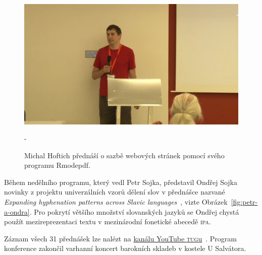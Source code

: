 \documentclass{csbulletin}
\newcommand\acro[1]{\textsc{\MakeLowercase{#1}}}
\begin{document}
\begin{figure}[p]
\centering
\includegraphics[width=\linewidth]{figs/michal-po-prednasce}\par\medskip
\fboxsep=0pt\kern-\fboxrule\relax{}%
\caption{Michal Hoftich přednáší o sazbě webových stránek pomocí svého programu Rmodepdf.}
\label{fig:michal}
\end{figure}

Během nedělního programu, který vedl Petr Sojka, představil Ondřej Sojka novinky z projektu univerzálních vzorů dělení slov v přednášce nazvané \emph{\foreignlanguage{english}{Expanding hyphenation patterns across Slavic languages}}~\cite{sojka2024extendinga, sojka2024extendingc}, vizte Obrázek~\ref{fig:petr-a-ondra}. Pro pokrytí většího množství slovanských jazyků se Ondřej chystá použít mezireprezentaci textu v mezinárodní fonetické abecedě \acro{IPA}.
\medskip

Záznam všech 31 přednášek lze nalézt na \href{https://www.youtube.com/playlist?list=PLLt9mKFAx-FZCy6aqYbXSNyaAkr8Nv14X}{kanálu YouTube \acro{TUG}u}~\cite{youtube}.
Program konference zakončil varhanní koncert barokních skladeb v kostele U Salvátora. 
\end{document}
